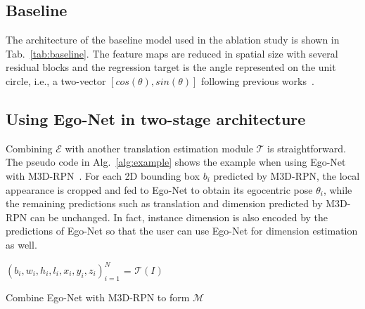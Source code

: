 \documentclass[final]{cvpr}
\begin{document}
\subsection{Baseline}
The architecture of the baseline model used in the ablation study is shown in Tab.~\ref{tab:baseline}. The feature maps are reduced in spatial size with several residual blocks and the regression target is the angle represented on the unit circle, i.e., a two-vector $[cos(\theta), sin(\theta)]$ following previous works~\cite{hara2017designing, mousavian20173d}.
\subsection{Using Ego-Net in two-stage architecture}
Combining $\mathcal{E}$ with another translation estimation module $\mathcal{T}$ is straightforward. The pseudo code in Alg.~\ref{alg:example} shows the example when using Ego-Net with M3D-RPN~\cite{brazil2019m3d}. For each 2D bounding box $b_i$ predicted by M3D-RPN, the local appearance is cropped and fed to Ego-Net to obtain its egocentric pose $\theta_i$, while the remaining predictions such as translation and dimension predicted by M3D-RPN can be unchanged. In fact, instance dimension is also encoded by the predictions of Ego-Net so that the user can use Ego-Net for dimension estimation as well.

\begin{algorithm}
	\footnotesize
	\SetAlgoLined
	$(b_i, w_i, h_i, l_i, x_i, y_i, z_i)_{i=1}^N$ = $\mathcal{T}(I)$\;
	\caption{Combine Ego-Net with M3D-RPN to form $\mathcal{M}$ } 
	\label{alg:example}
\end{algorithm}
\end{document}
